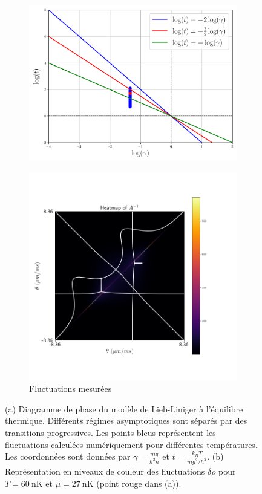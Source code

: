 \begin{figure}[H]
	\centering
	\begin{subfigure}[b]{0.45\textwidth}
		\includegraphics[width=\textwidth]{Figures/diagram.png}
		\caption{}
		\label{fig:diag}
	\end{subfigure}
	\hfill
	\begin{subfigure}[b]{0.45\textwidth}
		\includegraphics[width=\textwidth]{Figures/fluctu.png}
		\caption{Fluctuations mesurées}
		\label{fig.fluctu.A}
	\end{subfigure}
	\caption{(a) Diagramme de phase du modèle de Lieb-Liniger à l’équilibre thermique. Différents régimes asymptotiques sont séparés par des transitions progressives. Les points bleus représentent les fluctuations calculées numériquement pour différentes températures. Les coordonnées sont données par \( \gamma = \frac{m g}{\hbar^2 n} \) et \( t = \frac{k_B T}{m g^2/\hbar^2} \). (b) Représentation en niveaux de couleur des fluctuations \( \delta \rho \) pour \( T = 60~\mathrm{nK} \) et \( \mu = 27~\mathrm{nK} \) (point rouge dans (a)).}
	\label{fig:diag_fig}
\end{figure}

